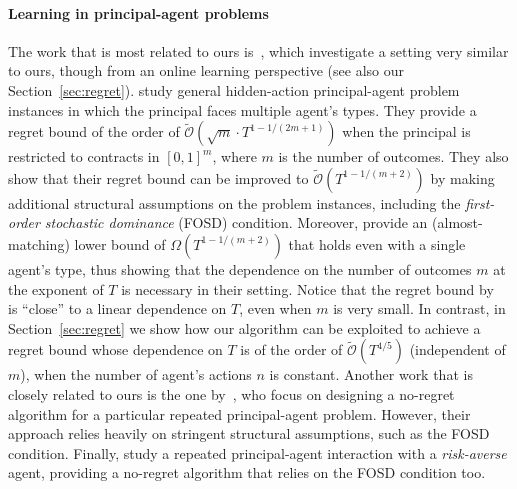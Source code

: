 \paragraph{Learning in principal-agent problems}
%
The work that is most related to ours is~\citep{zhu2022sample}, which investigate a setting very similar to ours, though from an online learning perspective (see also our Section~\ref{sec:regret}).
%
%
\citet{zhu2022sample} study general hidden-action principal-agent problem instances in which the principal faces multiple agent's types.
%
They provide a regret bound of the order of $\widetilde {\mathcal{O}}(\sqrt{m} \cdot T^{1 - 1/(2m+1)})$ when the principal is restricted to contracts in $[0,1]^m$, where $m$ is the number of outcomes.
%
They also show that their regret bound can be improved to $\widetilde {\mathcal{O}}( T^{1 - 1/(m+2)})$ by making additional structural assumptions on the problem instances, including the \emph{first-order stochastic dominance} (FOSD) condition.
%
Moreover, \citet{zhu2022sample} provide an (almost-matching) lower bound of $\Omega(T^{1-1/(m+2)})$ that holds even with a single agent's type, thus showing that the dependence on the number of outcomes $m$ at the exponent of $T$ is necessary in their setting.
%
Notice that the regret bound by~\citet{zhu2022sample} is ``close'' to a linear dependence on $T$, even when $m$ is very small.
%
In contrast, in Section~\ref{sec:regret} we show how our algorithm can be exploited to achieve a regret bound whose dependence on $T$ is of the order of $\widetilde{\mathcal{O}}(T^{4/5})$ (independent of $m$), when the number of agent's actions $n$ is constant.
%
%
Another work that is closely related to ours is the one by~\citet{ho2015adaptive}, who focus on designing a no-regret algorithm for a particular repeated principal-agent problem.
%
However, their approach relies heavily on stringent structural assumptions, such as the FOSD condition.
%
Finally, \cite{cohen2022learning} study a repeated principal-agent interaction with a \emph{risk-averse} agent, providing a no-regret algorithm that relies on the FOSD condition too.


